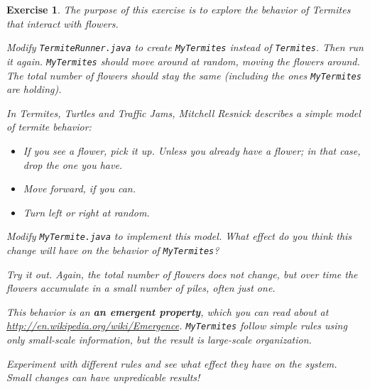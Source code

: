 \documentclass[12pt]{book}
\theoremstyle{exercise}
\newtheorem{exercise}{Exercise}[chapter]
\begin{document}
\begin{exercise}
The purpose of this exercise is to explore the behavior of Termites
that interact with flowers.

Modify {\tt TermiteRunner.java} to create {\tt MyTermites} instead
of {\tt Termites}.  Then run it again.  {\tt MyTermites} should move
around at random, moving the flowers around.  The total number of
flowers should stay the same (including the ones {\tt MyTermites}
are holding).

In {\em Termites, Turtles and Traffic Jams}, Mitchell Resnick describes
a simple model of termite behavior:

\begin{itemize}

\item If you see a flower, pick it up.  Unless you already have
a flower; in that case, drop the one you have.

\item Move forward, if you can.

\item Turn left or right at random.

\end{itemize}

Modify {\tt MyTermite.java} to implement this model.  What effect do
you think this change will have on the behavior of {\tt MyTermites}?

Try it out.  Again, the total number of flowers does not change,
but over time the flowers accumulate in a small number of piles, often
just one.

This behavior is an {\bf an emergent property}, which you can read
about at \url{http://en.wikipedia.org/wiki/Emergence}.  {\tt MyTermites}
follow simple rules using only small-scale information, but the result
is large-scale organization.

Experiment with different rules and see what effect they have on the
system.  Small changes can have unpredicable results!

\end{exercise}
\end{document}
